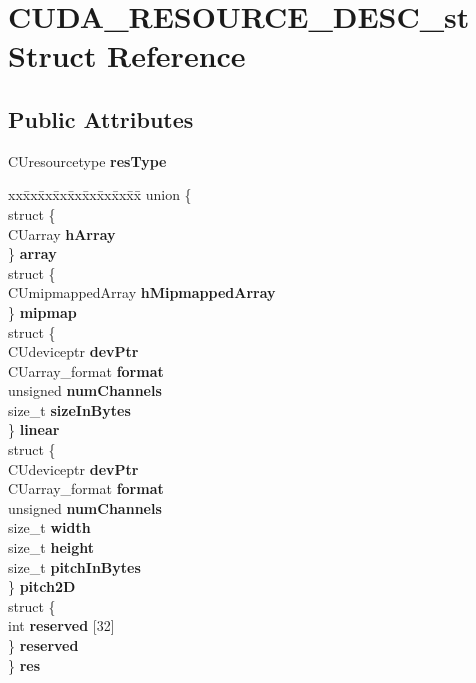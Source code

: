 \hypertarget{structCUDA__RESOURCE__DESC__st}{}\section{C\+U\+D\+A\+\_\+\+R\+E\+S\+O\+U\+R\+C\+E\+\_\+\+D\+E\+S\+C\+\_\+st Struct Reference}
\label{structCUDA__RESOURCE__DESC__st}
\subsection*{Public Attributes}
\begin{DoxyCompactItemize}
\item 
C\+Uresourcetype {\bfseries res\+Type}\hypertarget{structCUDA__RESOURCE__DESC__st_aa654d711d4f0c699fe2a4d5967af93d1}{}\label{structCUDA__RESOURCE__DESC__st_aa654d711d4f0c699fe2a4d5967af93d1}

\item 
\begin{tabbing}
xx\=xx\=xx\=xx\=xx\=xx\=xx\=xx\=xx\=\kill
union \{\\
\>struct \{\\
\>\>CUarray {\bfseries hArray}\\
\>\} {\bfseries array}\\
\>struct \{\\
\>\>CUmipmappedArray {\bfseries hMipmappedArray}\\
\>\} {\bfseries mipmap}\\
\>struct \{\\
\>\>CUdeviceptr {\bfseries devPtr}\\
\>\>CUarray\_format {\bfseries format}\\
\>\>unsigned {\bfseries numChannels}\\
\>\>size\_t {\bfseries sizeInBytes}\\
\>\} {\bfseries linear}\\
\>struct \{\\
\>\>CUdeviceptr {\bfseries devPtr}\\
\>\>CUarray\_format {\bfseries format}\\
\>\>unsigned {\bfseries numChannels}\\
\>\>size\_t {\bfseries width}\\
\>\>size\_t {\bfseries height}\\
\>\>size\_t {\bfseries pitchInBytes}\\
\>\} {\bfseries pitch2D}\\
\>struct \{\\
\>\>int {\bfseries reserved} \mbox{[}32\mbox{]}\\
\>\} {\bfseries reserved}\\
\} {\bfseries res}\hypertarget{structCUDA__RESOURCE__DESC__st_a70883ed0ba3984c4a78da71b182486a2}{}\label{structCUDA__RESOURCE__DESC__st_a70883ed0ba3984c4a78da71b182486a2}
\\


\end{tabbing}
\end{DoxyCompactItemize}
